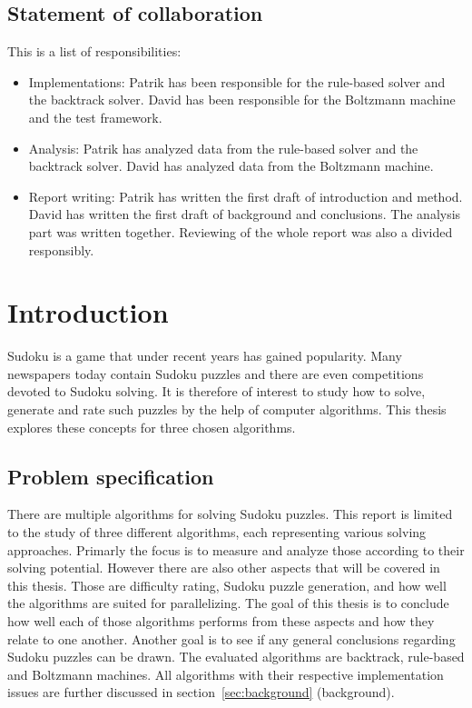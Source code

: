 \documentclass[a4paper,11pt]{kth-mag}
\begin{document}
\section{Statement of collaboration}
This is a list of responsibilities:
\begin{itemize}
    \item Implementations: Patrik has been responsible for the rule-based solver and the backtrack solver. David has been responsible for the Boltzmann machine and the test framework.
    \item Analysis: Patrik has analyzed data from the rule-based solver and the backtrack solver. David has analyzed data from the Boltzmann machine.
    \item Report writing: Patrik has written the first draft of introduction and method. David has written the first draft of background and conclusions. The analysis part was written together. Reviewing of the whole report was also a divided responsibly.
\end{itemize}

\clearpage
\tableofcontents*
\clearpage
\listoffigures*
\mainmatter
\pagestyle{newchap}

\chapter{Introduction}
Sudoku is a game that under recent years has gained popularity.
Many newspapers today contain Sudoku puzzles and there are even competitions devoted to Sudoku solving.
It is therefore of interest to study how to solve, generate and rate such puzzles by the help of computer algorithms. This thesis explores these concepts for three chosen algorithms.

\FloatBarrier
\section{Problem specification}
There are multiple algorithms for solving Sudoku puzzles.
This report is limited to the study of three different algorithms, each representing various solving approaches.
Primarly the focus is to measure and analyze those according to their solving potential.
However there are also other aspects that will be covered in this thesis.
Those are difficulty rating, Sudoku puzzle generation, and how well the algorithms are suited for parallelizing.
The goal of this thesis is to conclude how well each of those algorithms performs from these aspects and how they relate to one another.
Another goal is to see if any general conclusions regarding Sudoku puzzles can be drawn.
The evaluated algorithms are backtrack, rule-based and Boltzmann machines.
All algorithms with their respective implementation issues are further discussed in section~\ref{sec:background} (background).
\end{document}

